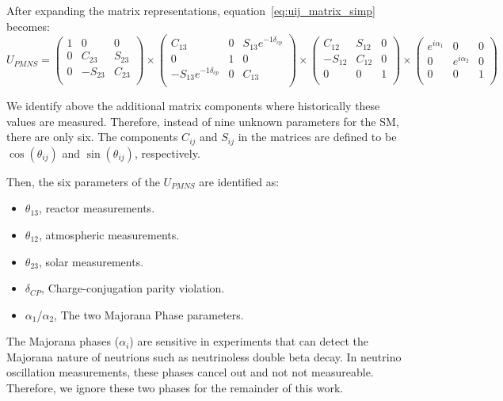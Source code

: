 After expanding the matrix representations, equation~\ref{eq:uij_matrix_simp} becomes:
\begin{equation}
U_{PMNS}
=
\begin{pmatrix}
1 & 0 & 0 \\
0 & C_{23} & S_{23} \\
0 & -S_{23} & C_{23} \\
\end{pmatrix}
\times
\begin{pmatrix}
C_{13} & 0 & S_{13}e^{-1\delta_{cp}} \\
0 & 1 & 0 \\
-S_{13}e^{-1\delta_{cp}} & 0 & C_{13} \\
\end{pmatrix}
\times
\begin{pmatrix}
C_{12} & S_{12} & 0 \\
-S_{12} & C_{12} & 0 \\
0 & 0 & 1 \\
\end{pmatrix}
\times
\begin{pmatrix}
e^{i\alpha_{1}} & 0 & 0 \\
0 & e^{i\alpha_{2}} & 0 \\
0 & 0 & 1 \\
\end{pmatrix}
\end{equation}

We identify above the additional matrix components where historically these values are measured.
Therefore, instead of nine unknown parameters for the SM, there are only six.
The components $C_{ij}$ and $S_{ij}$ in the matrices are defined to be $\cos(\theta_{ij})$ and $\sin(\theta_{ij})$, respectively.

Then, the six parameters of the $U_{PMNS}$ are identified as:

\begin{itemize}
    \item $\theta_{13}$, reactor measurements.
    \item $\theta_{12}$, atmospheric measurements.
    \item $\theta_{23}$, solar measurements.
    \item $\delta_{CP}$, Charge-conjugation parity violation.
    \item $\alpha_{1}$/$\alpha_{2}$, The two Majorana Phase parameters.
\end{itemize}

The Majorana phases ($\alpha_{i}$) are sensitive in experiments that can detect the Majorana nature of neutrions such as neutrinoless double beta decay.
In neutrino oscillation measurements, these phases cancel out and not not measureable.
Therefore, we ignore these two phases for the remainder of this work.


